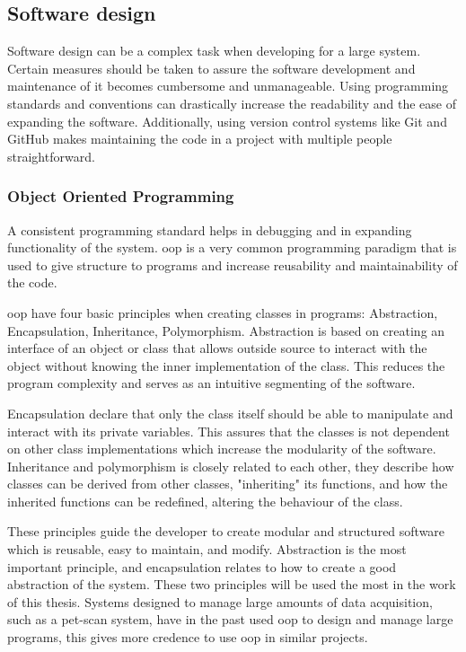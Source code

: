 \documentclass[main.tex]{subfiles}
\begin{document}
\subsection{Software design}

Software design can be a complex task when developing for a large system. Certain measures should be taken to assure the software development and maintenance of it becomes cumbersome and unmanageable. Using programming standards and conventions can drastically increase the readability and the ease of expanding the software. Additionally, using version control systems like Git and GitHub makes maintaining the code in a project with multiple people straightforward.

\subsubsection{Object Oriented Programming}

A consistent programming standard helps in debugging and in expanding functionality of the system. \gls{oop} is a very common programming paradigm that is used to give structure to programs and increase reusability and maintainability of the code.

\gls{oop} have four basic principles when creating classes in programs: Abstraction, Encapsulation, Inheritance, Polymorphism. Abstraction is based on creating an interface of an object or class that allows outside source to interact with the object without knowing the inner implementation of the class. This reduces the program complexity and serves as an intuitive segmenting of the software.

Encapsulation declare that only the class itself should be able to manipulate and interact with its private variables. This assures that the classes is not dependent on other class implementations which increase the modularity of the software. Inheritance and polymorphism is closely related to each other, they describe how classes can be derived from other classes, "inheriting" its functions, and how the inherited functions can be redefined, altering the behaviour of the class.


These principles guide the developer to create modular and structured software which is reusable, easy to maintain, and modify. Abstraction is the most important principle, and encapsulation relates to how to create a good abstraction of the system. These two principles will be used the most in the work of this thesis. Systems designed to manage large amounts of data acquisition, such as a \gls{pet}-scan system, have in the past used \gls{oop} to design and manage large programs\cite{pet_control_system}, this gives more credence to use \gls{oop} in similar projects.
\end{document}
